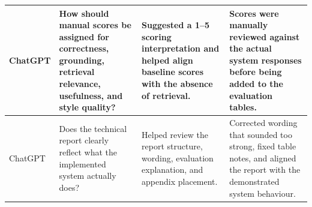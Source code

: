 \documentclass[10pt,conference]{IEEEtran}
\begin{document}
\begin{table}[!t]
\begin{tabularx}{\textwidth}{p{2.2cm} p{3.4cm} p{3.4cm} X}
ChatGPT 
& How should manual scores be assigned for correctness, grounding, retrieval relevance, usefulness, and style quality? 
& Suggested a 1--5 scoring interpretation and helped align baseline scores with the absence of retrieval. 
& Scores were manually reviewed against the actual system responses before being added to the evaluation tables. \\

\midrule

ChatGPT 
& Does the technical report clearly reflect what the implemented system actually does? 
& Helped review the report structure, wording, evaluation explanation, and appendix placement. 
& Corrected wording that sounded too strong, fixed table notes, and aligned the report with the demonstrated system behaviour. \\

\bottomrule
\end{tabularx}
\end{table}
\end{document}
